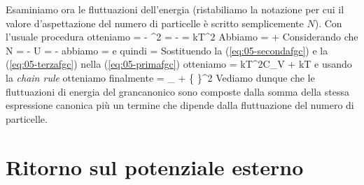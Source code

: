 Esaminiamo ora le fluttuazioni dell'energia (ristabiliamo la notazione per cui il valore d'aspettazione del numero di particelle è scritto semplicemente $N$). Con l'usuale procedura otteniamo
\be
\label{eq:05-primafgc}
 =  - ^2 = - = kT^2
\ee
Abbiamo
\be
\label{eq:05-secondafgc}
 =  + 
\ee
Considerando che
\be
N = - \quad\quad\quad U = -
\ee
abbiamo
\be
{} = 
\ee
e quindi
\be
\label{eq:05-terzafgc}
 = 
\ee
Sostituendo la (\ref{eq:05-secondafgc}) e la (\ref{eq:05-terzafgc}) nella (\ref{eq:05-primafgc}) otteniamo
\be
{} = kT^2C_V + kT
\ee
e usando la {\em chain rule} otteniamo finalmente
\be
{} = _{} + 
\left\{
\right\}^2 
\ee
Vediamo dunque che le fluttuazioni di energia del grancanonico sono composte dalla somma della stessa espressione canonica più un termine che dipende dalla fluttuazione del numero di particelle.	

\section{Ritorno sul potenziale esterno}
\label{sec:05-potesternoGC}

